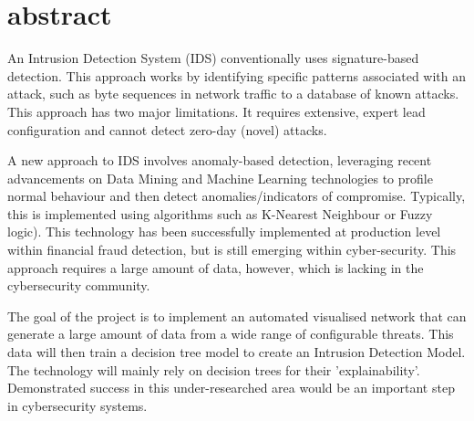 \chapter*{abstract}
An Intrusion Detection System (IDS) conventionally uses signature-based detection. This approach works by identifying specific patterns associated with an attack, such as byte sequences in network traffic to a database of known attacks. This approach has two major limitations. It requires extensive, expert lead configuration and cannot detect zero-day (novel) attacks.

A new approach to IDS involves anomaly-based detection, leveraging recent advancements on Data Mining and Machine Learning technologies to profile normal behaviour and then detect anomalies/indicators of compromise. Typically, this is implemented using algorithms such as K-Nearest Neighbour or Fuzzy logic). This technology has been successfully implemented at production level within financial fraud detection, but is still emerging within cyber-security. This approach requires a large amount of data, however, which is lacking in the cybersecurity community.

The goal of the project is to implement an automated visualised network that can generate a large amount of data from a wide range of configurable threats. This data will then train a decision tree model to create an Intrusion Detection Model. The technology will mainly rely on decision trees for their 'explainability'. Demonstrated success in this under-researched area would be an important step in cybersecurity systems.